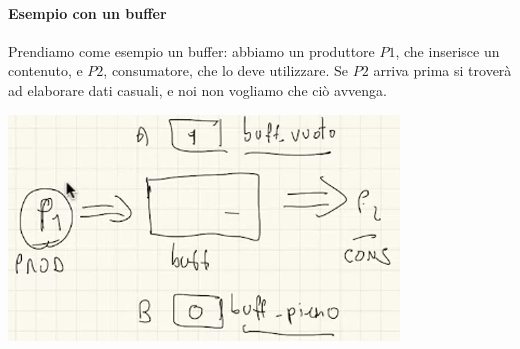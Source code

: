 \paragraph{Esempio con un buffer}
Prendiamo come esempio un buffer: abbiamo un produttore $P1$, che inserisce un contenuto, e $P2$, consumatore, che lo deve utilizzare.  Se $P2$ arriva prima si troverà ad elaborare dati casuali, e noi non vogliamo che ciò avvenga.\begin{center}\includegraphics[scale=.8]{img/192.PNG}\end{center}
